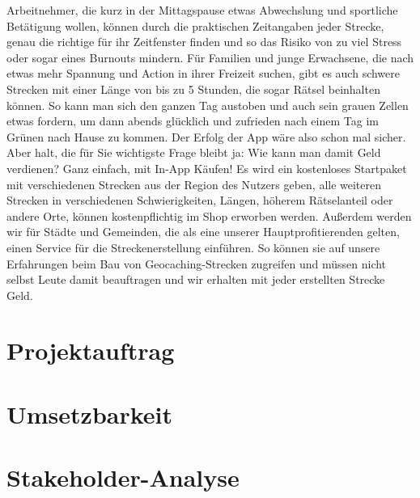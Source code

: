 \documentclass[a4paper, 12pp]{article}
\begin{document}
Arbeitnehmer, die kurz in der Mittagspause etwas Abwechslung und sportliche Betätigung wollen, können durch die praktischen Zeitangaben jeder Strecke, genau die richtige für ihr Zeitfenster finden und so das Risiko von zu viel Stress oder sogar eines Burnouts mindern.\newline
Für Familien und junge Erwachsene, die nach etwas mehr Spannung und Action in ihrer Freizeit suchen, gibt es auch schwere Strecken mit einer Länge von bis zu 5 Stunden, die sogar Rätsel beinhalten können. So kann man sich den ganzen Tag austoben und auch sein grauen Zellen etwas fordern, um dann abends glücklich und zufrieden nach einem Tag im Grünen nach Hause zu kommen.\newline
Der Erfolg der App wäre also schon mal sicher. Aber halt, die für Sie wichtigste Frage bleibt ja: Wie kann man damit Geld verdienen? Ganz einfach, mit In-App Käufen!\newline
Es wird ein kostenloses Startpaket mit verschiedenen Strecken aus der Region des Nutzers geben, alle weiteren Strecken in verschiedenen Schwierigkeiten, Längen, höherem Rätselanteil oder andere Orte, können kostenpflichtig im Shop erworben werden. Außerdem werden wir für Städte und Gemeinden, die als eine unserer Hauptprofitierenden gelten, einen Service für die Streckenerstellung einführen. So können sie auf unsere Erfahrungen beim Bau von Geocaching-Strecken zugreifen und müssen nicht selbst Leute damit beauftragen und wir erhalten mit jeder erstellten Strecke Geld.

\section{Projektauftrag}
\section{Umsetzbarkeit}
\section{Stakeholder-Analyse}
\end{document}
